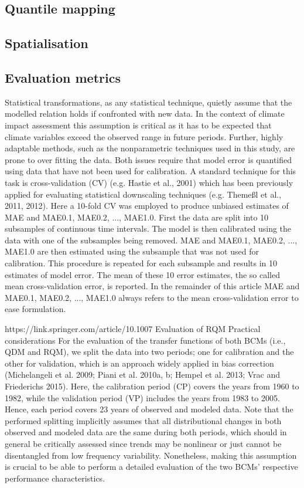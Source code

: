 \documentclass[hess, manuscript]{copernicus}
\begin{document}
\subsection{Quantile mapping}
\subsection{Spatialisation}
\subsection{Evaluation metrics}

Statistical transformations, as any statistical technique,
quietly assume that the modelled relation holds if confronted
with new data. In the context of climate impact assessment
this assumption is critical as it has to be expected that climate variables exceed the observed range in future periods.
Further, highly adaptable methods, such as the nonparametric techniques used in this study, are prone to over fitting the
data. Both issues require that model error is quantified using
data that have not been used for calibration. A standard technique for this task is cross-validation (CV) (e.g. Hastie et al.,
2001) which has been previously applied for evaluating statistical downscaling techniques (e.g. Themeßl et al., 2011,
2012). Here a 10-fold CV was employed to produce unbiased estimates of MAE and MAE0.1, MAE0.2, ..., MAE1.0.
First the data are split into 10 subsamples of continuous time
intervals. The model is then calibrated using the data with
one of the subsamples being removed. MAE and MAE0.1,
MAE0.2, ..., MAE1.0 are then estimated using the subsample
that was not used for calibration. This procedure is repeated
for each subsample and results in 10 estimates of model error. The mean of these 10 error estimates, the so called mean
cross-validation error, is reported. In the remainder of this article MAE and MAE0.1, MAE0.2, ..., MAE1.0 always refers
to the mean cross-validation error to ease formulation.

https://link.springer.com/article/10.1007%
Evaluation of RQM
Practical considerations
For the evaluation of the transfer functions of both BCMs (i.e., QDM and RQM), we split the data into two periods; one for calibration and the other for validation, which is an approach widely applied in bias correction (Michelangeli et al. 2009; Piani et al. 2010a, b; Hempel et al. 2013; Vrac and Friederichs 2015). Here, the calibration period (CP) covers the years from 1960 to 1982, while the validation period (VP) includes the years from 1983 to 2005. Hence, each period covers 23 years of observed and modeled data. Note that the performed splitting implicitly assumes that all distributional changes in both observed and modeled data are the same during both periods, which should in general be critically assessed since trends may be nonlinear or just cannot be disentangled from low frequency variability. Nonetheless, making this assumption is crucial to be able to perform a detailed evaluation of the two BCMs’ respective performance characteristics.
\end{document}
